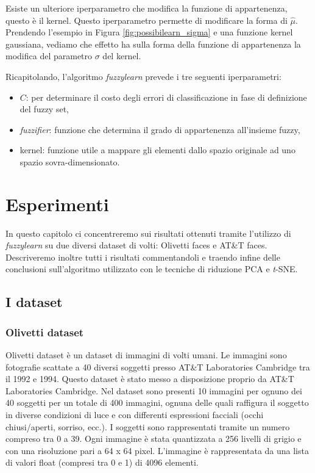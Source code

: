 \documentclass[12pt,italian]{report}
\begin{document}
Esiste un ulteriore iperparametro che modifica la funzione di appartenenza, questo è il kernel. Questo iperparametro permette di modificare la forma di $\hat \mu$. Prendendo l'esempio in Figura \ref{fig:possibilearn_sigma} e una funzione kernel gaussiana, vediamo che effetto ha sulla forma della funzione di appartenenza la modifica del parametro $ \sigma $ del kernel.

Ricapitolando, l'algoritmo \emph{fuzzylearn} prevede i tre seguenti iperparametri:
\begin{itemize}
	\item $C$: per determinare il costo degli errori di classificazione in fase di definizione del fuzzy set,
	\item \emph{fuzzifier}: funzione che determina il grado di appartenenza all'insieme fuzzy,
	\item kernel: funzione utile a mappare gli elementi dallo spazio originale ad uno spazio sovra-dimensionato.
\end{itemize}

\chapter{Esperimenti}

In questo capitolo ci concentreremo sui risultati ottenuti tramite l'utilizzo di \emph{fuzzylearn} su due diversi dataset di volti: Olivetti faces e AT\&T faces. Descriveremo inoltre tutti i risultati commentandoli e traendo infine delle conclusioni sull'algoritmo utilizzato con le tecniche di riduzione PCA e \emph{t}-SNE.

\section{I dataset}
\subsection{Olivetti dataset}
Olivetti dataset è un dataset di immagini di volti umani. Le immagini sono fotografie scattate a 40 diversi soggetti presso AT\&T Laboratories Cambridge tra il 1992 e 1994. Questo dataset è stato messo a disposizione proprio da AT\&T Laboratories Cambridge.
Nel dataset sono presenti 10 immagini per ognuno dei 40 soggetti per un totale di 400 immagini, ognuna delle quali raffigura il soggetto in diverse condizioni di luce e con differenti espressioni facciali (occhi chiusi/aperti, sorriso, ecc.). I soggetti sono rappresentati tramite un numero compreso tra 0 a 39. Ogni immagine è stata quantizzata a 256 livelli di grigio e con una risoluzione pari a 64 x 64 pixel. L'immagine è rappresentata da una lista di valori float (compresi tra 0 e 1) di 4096 elementi. 
\end{document}
